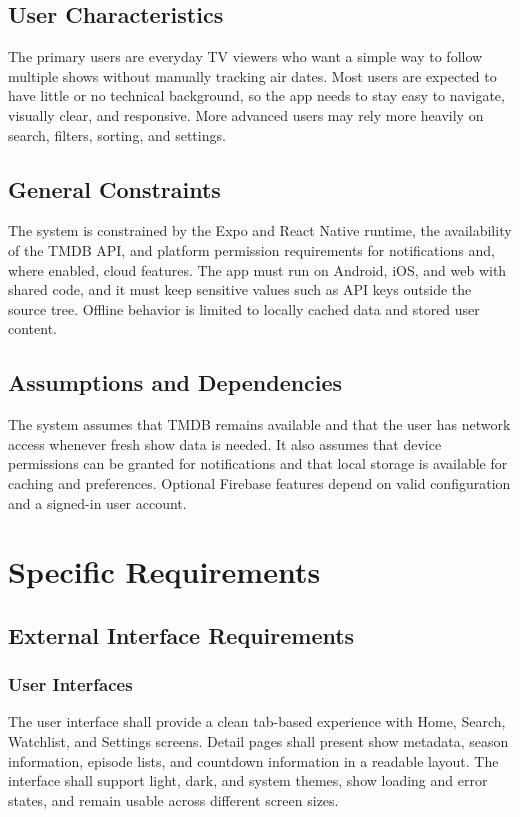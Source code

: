 \subsection{User Characteristics}
The primary users are everyday TV viewers who want a simple way to follow multiple shows without manually tracking air dates. Most users are expected to have little or no technical background, so the app needs to stay easy to navigate, visually clear, and responsive. More advanced users may rely more heavily on search, filters, sorting, and settings.

\subsection{General Constraints}
The system is constrained by the Expo and React Native runtime, the availability of the TMDB API, and platform permission requirements for notifications and, where enabled, cloud features. The app must run on Android, iOS, and web with shared code, and it must keep sensitive values such as API keys outside the source tree. Offline behavior is limited to locally cached data and stored user content.

\subsection{Assumptions and Dependencies}
The system assumes that TMDB remains available and that the user has network access whenever fresh show data is needed. It also assumes that device permissions can be granted for notifications and that local storage is available for caching and preferences. Optional Firebase features depend on valid configuration and a signed-in user account.

\section{Specific Requirements}

\subsection{External Interface Requirements}

\subsubsection{User Interfaces}
The user interface shall provide a clean tab-based experience with Home, Search, Watchlist, and Settings screens. Detail pages shall present show metadata, season information, episode lists, and countdown information in a readable layout. The interface shall support light, dark, and system themes, show loading and error states, and remain usable across different screen sizes.

